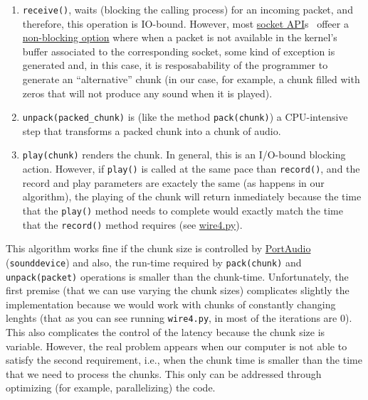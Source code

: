 \begin{enumerate}
\item \verb|receive()|, waits (blocking the calling process) for an
  incoming packet, and therefore, this operation is IO-bound. However,
  most \href{https://docs.python.org/3/library/socket.html}{socket
    API}s~\cite{python} offeer a
  \href{https://docs.python.org/3.8/library/socket.html#socket.socket.setblocking}{non-blocking
    option} where when a packet is not available in the kernel's
  buffer associated to the corresponding socket, some kind of
  exception is generated and, in this case, it is resposabability of
  the programmer to generate an ``alternative'' chunk (in our case,
  for example, a chunk filled with zeros that will not produce any
  sound when it is played).

\item \verb|unpack(packed_chunk)| is (like the method
  \texttt{pack(chunk)}) a CPU-intensive step that transforms a
  packed chunk into a chunk of audio.

\item \verb|play(chunk)| renders the chunk. In general, this is an
  I/O-bound blocking action. However, if \verb|play()| is called at
  the same pace than \verb|record()|, and the record and play
  parameters are exactely the same (as happens in our algorithm), the
  playing of the chunk will return inmediately because the time that
  the \verb|play()| method needs to complete would exactly match the
  time that the \verb|record()| method requires (see
  \href{https://github.com/Tecnologias-multimedia/InterCom/blob/master/test/sounddevice/wire4.py}{wire4.py}).
\end{enumerate}

This algorithm works fine if the chunk size is controlled by
\href{http://www.portaudio.com/}{PortAudio}~\cite{portaudio}
(\verb|sounddevice|) and also, the run-time required by
\verb|pack(chunk)| and \verb|unpack(packet)| operations is smaller
than the chunk-time. Unfortunately, the first premise (that we can use
varying the chunk sizes) complicates slightly the implementation
because we would work with chunks of constantly changing lenghts (that
as you can see running \verb|wire4.py|, in most of the iterations are
0). This also complicates the control of the latency because the chunk
size is variable. However, the real problem appears when our computer
is not able to satisfy the second requirement, i.e., when the chunk
time is smaller than the time that we need to process the chunks. This
only can be addressed through optimizing (for example, parallelizing)
the code.

